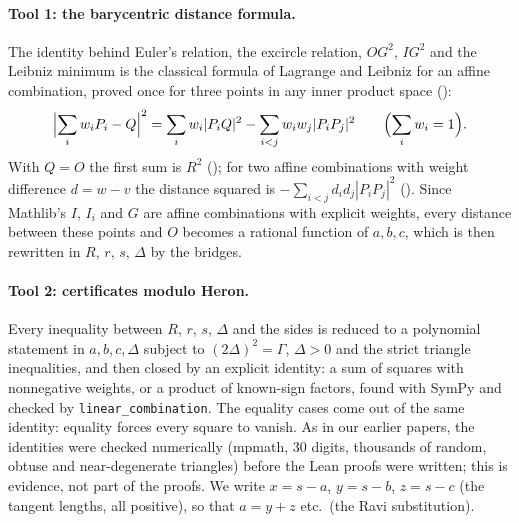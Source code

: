 \documentclass[11pt]{article}
\theoremstyle{definition}
\theoremstyle{remark}
\newcommand{\lean}[1]{\texttt{#1}}
\begin{document}
\paragraph{Tool 1: the barycentric distance formula.} The identity behind Euler's relation, the
excircle relation, $OG^2$, $IG^2$ and the Leibniz minimum is the classical formula of Lagrange and
Leibniz for an affine combination, proved once for three points in any inner product space
():
\begin{equation}\label{eq:leibniz}
\Bigl|\sum_i w_iP_i-Q\Bigr|^2=\sum_i w_i|P_iQ|^2-\sum_{i<j}w_iw_j|P_iP_j|^2\qquad
\Bigl(\sum_i w_i=1\Bigr).
\end{equation}
With $Q=O$ the first sum is $R^2$ (); for two
affine combinations with weight difference $d=w-v$ the distance squared is
$-\sum_{i<j}d_id_j|P_iP_j|^2$ ().
Since Mathlib's $I$, $I_i$ and $G$ are affine combinations with explicit weights, every distance
between these points and $O$ becomes a rational function of $a,b,c$, which is then rewritten in
$R$, $r$, $s$, $\Delta$ by the bridges.

\paragraph{Tool 2: certificates modulo Heron.} Every inequality between $R$, $r$, $s$, $\Delta$ and
the sides is reduced to a polynomial statement in $a,b,c,\Delta$ subject to $(2\Delta)^2=\Gamma$,
$\Delta>0$ and the strict triangle inequalities, and then closed by an explicit identity: a
sum of squares with nonnegative weights, or a product of known-sign factors, found with SymPy and
checked by \lean{linear\_combination}. The equality cases come out of the same identity: equality
forces every square to vanish. As in our earlier papers, the identities were checked numerically
(mpmath, 30 digits, thousands of random, obtuse and near-degenerate triangles) before the Lean
proofs were written; this is evidence, not part of the proofs. We write $x=s-a$, $y=s-b$, $z=s-c$
(the tangent lengths, all positive), so that $a=y+z$ etc.\ (the Ravi substitution).
\end{document}
